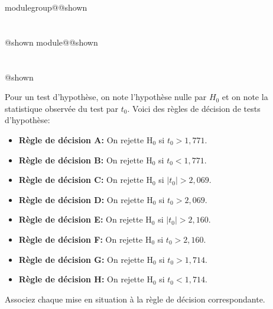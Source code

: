 \documentclass{Evaluation}
\makeatletter
\newcommand{\currentmodulekey}{}
\newcommand{\currentmoduletitle}{}
\newcommand{\currentgroupkey}{}
\newcommand{\currentgrouptitle}{}
\newcommand{\showmoduleifneeded}{%
  \ifx\currentgroupkey\empty\else
    \expandafter\ifx\csname modulegroup@\currentgroupkey @shown\endcsname\relax
      \section*{\currentgrouptitle}%
      \expandafter\gdef\csname modulegroup@\currentgroupkey @shown\endcsname{1}%
    \fi
  \fi
  \expandafter\ifx\csname module@\currentmodulekey @shown\endcsname\relax
    \section*{\currentmoduletitle}%
    \expandafter\gdef\csname module@\currentmodulekey @shown\endcsname{1}%
  \fi
}
\newenvironment{A23}{\showmoduleifneeded}{}
\makeatother
\begin{document}
\begin{questions}
\begin{A23}
Pour un test d'hypothèse, on note l'hypothèse nulle par $H_0$ et on note la statistique observée du test par $t_0$. Voici des règles de décision de tests d'hypothèse:

\begin{itemize}

        \item {\bf Règle de décision A:} On rejette $\mathrm{H}_0$ si $t_0 > 1,771$. 
    \item {\bf Règle de décision B:} On rejette $\mathrm{H}_0$ si $t_0 < 1,771$.  

    \item {\bf Règle de décision C:}  On rejette $\mathrm{H}_0$ si $|t_0| >2,069$. 
    \item {\bf Règle de décision D:}  On rejette $\mathrm{H}_0$ si $t_0 >2,069$. 

        \item {\bf Règle de décision E:}  On rejette $\mathrm{H}_0$ si $|t_0| > 2,160$.  
    \item {\bf Règle de décision F:} On rejette $\mathrm{H}_0$ si $t_0 > 2,160$. 
    \item {\bf Règle de décision G:}  On rejette $\mathrm{H}_0$ si $t_0 > 1,714$. 
    \item {\bf Règle de décision H:}  On rejette $\mathrm{H}_0$ si $t_0 < 1,714$. 
\end{itemize}

Associez chaque mise en situation à la règle de décision correspondante.

\end{A23}
\end{questions}
\end{document}
